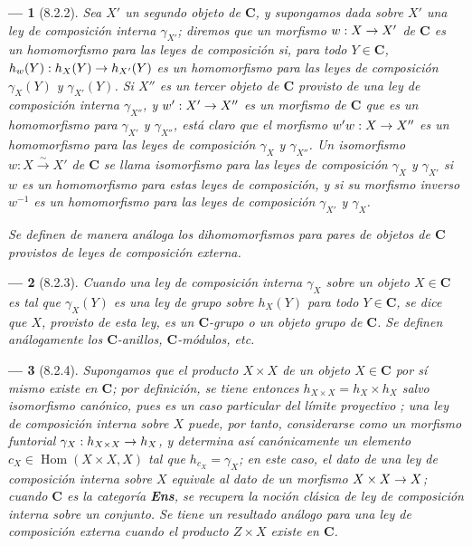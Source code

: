 \documentclass[10pt,oneside,openany]{book}
\theoremstyle{egaenv}\newtheorem*{env}{---}
\theoremstyle{egastatement}
\theoremstyle{egadescription}
\newcommand{\oldpage}[2][]{\marginnote{\normalfont\scriptsize\textbf{#1}\,|\,#2}\ignorespaces}
\renewcommand{\to}{\mathchoice{\longrightarrow}{\rightarrow}{\rightarrow}{\rightarrow}}
\begin{document}
\begin{env}[8.2.2]
\label{0.8.2.2}
\label{0.8.2.2-fr}
Sea $X'$ un segundo objeto de $\boldsymbol{C}$, y supongamos dada sobre $X'$ una ley de composición interna $\gamma_{X'}$; diremos que un morfismo
$w:X\to X'$ de $\boldsymbol{C}$ es un \emph{homomorfismo} para las leyes de composición si, para todo $Y\in\boldsymbol{C}$, $h_w(Y):h_X(Y)\to h_{X'}(Y)$ es un \emph{homomorfismo} para las leyes de composición $\gamma_X(Y)$ y $\gamma_{X'}(Y)$.
Si $X''$ es un tercer
\oldpage[0\textsubscript{III}]{10}
objeto de $\boldsymbol{C}$ provisto de una ley de composición interna $\gamma_{X''}$, y $w':X'\to X''$ es un morfismo de $\boldsymbol{C}$ que es un homomorfismo para $\gamma_{X'}$ y $\gamma_{X''}$, está claro que el morfismo $w'w:X\to X''$ es un homomorfismo para las leyes de composición $\gamma_X$ y $\gamma_{X''}$.
Un isomorfismo $w:X\xrightarrow{\sim}X'$ de $\boldsymbol{C}$ se llama \emph{isomorfismo para las leyes de composición} $\gamma_X$ y $\gamma_{X'}$ si $w$ es un homomorfismo para estas leyes de composición, y si su morfismo inverso $w^{-1}$ es un homomorfismo para las leyes de composición $\gamma_{X'}$ y $\gamma_X$.

Se definen de manera análoga los \emph{dihomomorfismos} para pares de objetos de $\boldsymbol{C}$ provistos de leyes de composición externa.
\end{env}

\begin{env}[8.2.3]
\label{0.8.2.3}
\label{0.8.2.3-fr}
Cuando una ley de composición interna $\gamma_X$ sobre un objeto $X\in \boldsymbol{C}$ es tal que $\gamma_X(Y)$ es una ley de \emph{grupo} sobre $h_X(Y)$ para \emph{todo} $Y\in \boldsymbol{C}$, se dice que $X$, provisto de esta ley, es un \emph{$\boldsymbol{C}$-grupo} o un \emph{objeto grupo de $\boldsymbol{C}$}.
Se definen análogamente los \emph{$\boldsymbol{C}$-anillos}, \emph{$\boldsymbol{C}$-módulos}, etc.
\end{env}

\begin{env}[8.2.4]
\label{0.8.2.4}
\label{0.8.2.4-fr}
Supongamos que el \emph{producto} $X\times X$ de un objeto $X\in \boldsymbol{C}$ por sí mismo existe en $\boldsymbol{C}$; por definición, se tiene entonces $h_{X\times X}=h_X\times h_X$ salvo isomorfismo canónico, pues es un caso particular del límite proyectivo ; una ley de composición interna sobre $X$ puede, por tanto, considerarse como un morfismo funtorial $\gamma_X:h_{X\times X}\to h_X$, y determina así canónicamente  un elemento $c_X\in\operatorname{Hom}(X\times X,X)$ tal que $h_{c_X}=\gamma_X$; en este caso, el dato de una ley de composición interna sobre $X$ equivale al dato de un morfismo $X\times X\to X$; cuando $\boldsymbol{C}$ es la categoría \textbf{\textit{Ens}}, se recupera la noción clásica de ley de composición interna sobre un conjunto. Se tiene un resultado análogo para una ley de composición externa cuando el producto $Z\times X$ existe en $\boldsymbol{C}$.
\end{env}
\end{document}
